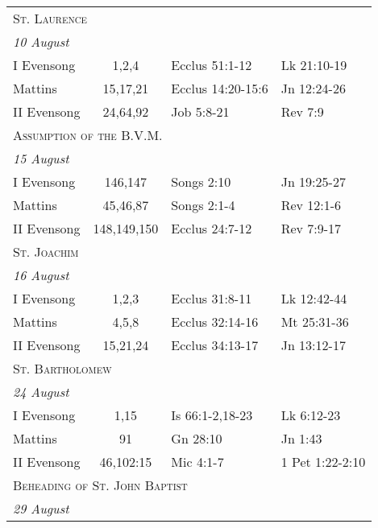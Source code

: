 \begin{longtable}{l c l l}
\multicolumn{4}{l}{\textsc{St. Laurence}}\\
\multicolumn{4}{l}{\textit{10 August}}\\
\hspace{1em} I Evensong&1,2,4&Ecclus 51:1-12&Lk 21:10-19\\
\hspace{1em} Mattins&15,17,21&Ecclus 14:20-15:6&Jn 12:24-26\\
\hspace{1em} II Evensong&24,64,92&Job 5:8-21&Rev 7:9\\
%
\multicolumn{4}{l}{\textsc{Assumption of the B.V.M.}}\\
\multicolumn{4}{l}{\textit{15 August}}\\
\hspace{1em} I Evensong&146,147&Songs 2:10&Jn 19:25-27\\
\hspace{1em} Mattins&45,46,87&Songs 2:1-4&Rev 12:1-6\\
\hspace{1em} II Evensong&148,149,150&Ecclus 24:7-12&Rev 7:9-17\\
\multicolumn{4}{l}{\textsc{St. Joachim}}\\
\multicolumn{4}{l}{\textit{16 August}}\\
\hspace{1em} I Evensong&1,2,3&Ecclus 31:8-11&Lk 12:42-44\\
\hspace{1em} Mattins&4,5,8&Ecclus 32:14-16&Mt 25:31-36\\
\hspace{1em} II Evensong&15,21,24&Ecclus 34:13-17&Jn 13:12-17\\
\multicolumn{4}{l}{\textsc{St. Bartholomew}}\\
\multicolumn{4}{l}{\textit{24 August}}\\
\hspace{1em} I Evensong&1,15&Is 66:1-2,18-23&Lk 6:12-23\\
\hspace{1em} Mattins&91&Gn 28:10&Jn 1:43\\
\hspace{1em} II Evensong&46,102:15&Mic 4:1-7&1 Pet 1:22-2:10\\
%
\multicolumn{4}{l}{\textsc{Beheading of St. John Baptist}}\\
\multicolumn{4}{l}{\textit{29 August}}\\

\end{longtable}
